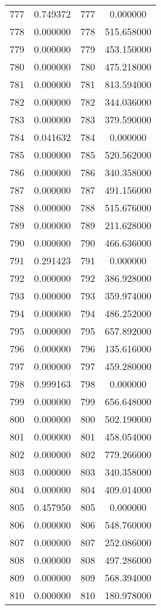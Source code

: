 \documentclass[12pt]{article}
\begin{document}
\begin{longtable}{@{}cccc@{}}
777 & 0.749372 & 777 & 0.000000 \\
778 & 0.000000 & 778 & 515.658000 \\
779 & 0.000000 & 779 & 453.150000 \\
780 & 0.000000 & 780 & 475.218000 \\
781 & 0.000000 & 781 & 813.594000 \\
782 & 0.000000 & 782 & 344.036000 \\
783 & 0.000000 & 783 & 379.590000 \\
784 & 0.041632 & 784 & 0.000000 \\
785 & 0.000000 & 785 & 520.562000 \\
786 & 0.000000 & 786 & 340.358000 \\
787 & 0.000000 & 787 & 491.156000 \\
788 & 0.000000 & 788 & 515.676000 \\
789 & 0.000000 & 789 & 211.628000 \\
790 & 0.000000 & 790 & 466.636000 \\
791 & 0.291423 & 791 & 0.000000 \\
792 & 0.000000 & 792 & 386.928000 \\
793 & 0.000000 & 793 & 359.974000 \\
794 & 0.000000 & 794 & 486.252000 \\
795 & 0.000000 & 795 & 657.892000 \\
796 & 0.000000 & 796 & 135.616000 \\
797 & 0.000000 & 797 & 459.280000 \\
798 & 0.999163 & 798 & 0.000000 \\
799 & 0.000000 & 799 & 656.648000 \\
800 & 0.000000 & 800 & 502.190000 \\
801 & 0.000000 & 801 & 458.054000 \\
802 & 0.000000 & 802 & 779.266000 \\
803 & 0.000000 & 803 & 340.358000 \\
804 & 0.000000 & 804 & 409.014000 \\
805 & 0.457950 & 805 & 0.000000 \\
806 & 0.000000 & 806 & 548.760000 \\
807 & 0.000000 & 807 & 252.086000 \\
808 & 0.000000 & 808 & 497.286000 \\
809 & 0.000000 & 809 & 568.394000 \\
810 & 0.000000 & 810 & 180.978000 \\

\end{longtable}
\end{document}
